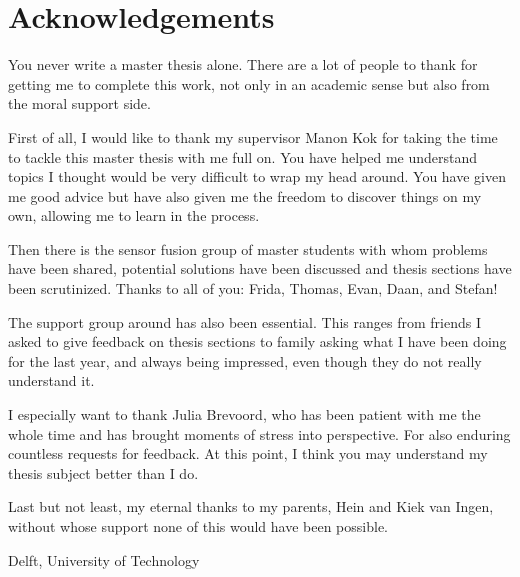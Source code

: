 %
\chapter{Acknowledgements}%

You never write a master thesis alone. There are a lot of people to thank for getting me to complete this work, not only in an academic sense but also from the moral support side.\par 

First of all, I would like to thank my supervisor Manon Kok for taking the time to tackle this master thesis with me full on. You have helped me understand topics I thought would be very difficult to wrap my head around. You have given me good advice but have also given me the freedom to discover things on my own, allowing me to learn in the process. \par 

Then there is the sensor fusion group of master students with whom problems have been shared, potential solutions have been discussed and thesis sections have been scrutinized. Thanks to all of you: Frida, Thomas, Evan, Daan, and Stefan!

The support group around has also been essential. This ranges from friends I asked to give feedback on thesis sections to family asking what I have been doing for the last year, and always being impressed, even though they do not really understand it.

I especially want to thank Julia Brevoord, who has been patient with me the whole time and has brought moments of stress into perspective. For also enduring countless requests for feedback. At this point, I think you may understand my thesis subject better than I do.

Last but not least, my eternal thanks to my parents, Hein and Kiek van Ingen, without whose support none of this would have been possible.



\vspace*{15mm}

Delft, University of Technology \hfill \mscname \\
\mscdate